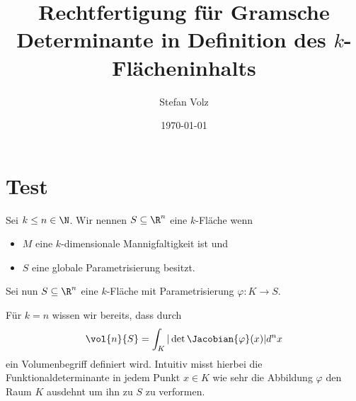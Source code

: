 \documentclass[a4paper,11pt]{article}
\begin{document}
\title{Rechtfertigung für Gramsche Determinante in Definition des $k$-Flächeninhalts}

\author{Stefan Volz}

\date{\today}

\maketitle

\section{Test}

\begin{definition}[$k$-Fläche]

    Sei $k \leq n \in \N$.
    Wir nennen $S \subseteq \R^n$ eine $k$-Fläche wenn
    \begin{itemize}
        \item $M$ eine $k$-dimensionale Mannigfaltigkeit ist und
        \item $S$ eine globale Parametrisierung besitzt.
    \end{itemize}
\end{definition}

Sei nun $S \subseteq \R^n$ eine $k$-Fläche mit Parametrisierung $\varphi : K \to S$.

Für $k = n$ wissen wir bereits, dass durch
\begin{align*}
    \vol{n}{S} = \int_K |\det \Jacobian{\varphi}(x)| d^n x
\end{align*}
ein Volumenbegriff definiert wird. Intuitiv misst hierbei die Funktionaldeterminante in jedem Punkt $x \in K$ wie sehr die Abbildung $\varphi$ den Raum $K$ ausdehnt um ihn zu $S$ zu verformen.
\end{document}
